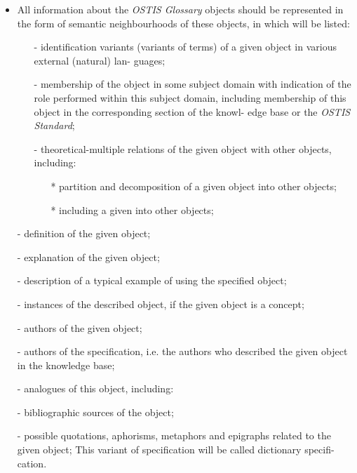 \documentclass{article}
\begin{document}
\begin{multicols}{2}
\begin{itemize}
\item{\textmd{ All information about the \textit{OSTIS Glossary} objects
should be represented in the form of semantic
neighbourhoods of these objects, in which will be
listed:}}
\begin{itemize}
\item[-] identification variants (variants of terms) of a
given object in various external (natural) lan-
guages;
\item[-] membership of the object in some subject domain
with indication of the role performed within this
subject domain, including membership of this
object in the corresponding section of the knowl-
edge base or the \textit{OSTIS Standard};
\item[-] theoretical-multiple relations of the given object
with other objects, including:
\begin{itemize}
\item[*] partition and decomposition of a given object into other objects;
\item[*] including a given into other objects;
\end{itemize}
\end{itemize}
\end{itemize}

\begin{itemize}
\begin{itemize}
\item[*] and other possible unions, intersections  
that form a given object;
\end{itemize}
\item[-] definition of the given object; 
\item[-] explanation of the given object;
\item[-] description of a typical example of using the
specified object;
\item[-] instances of the described object, if the given
object is a concept;
\item[-] authors of the given object;
\item[-] authors of the specification, i.e. the authors who
described the given object in the knowledge base;
\item[-] analogues of this object, including:
\end{itemize}

\begin{itemize}
\begin{itemize}
\item[*]close analogues of the given object;
\item[*]differences and similarities with other 
objects, including listed analogues;
\end{itemize}
\item[-] bibliographic sources of the object;
\item[-] possible quotations, aphorisms, metaphors and
epigraphs related to the given object; This variant
of specification will be called dictionary specifi-
cation.


\end{itemize}
\end{multicols}
\end{document}
